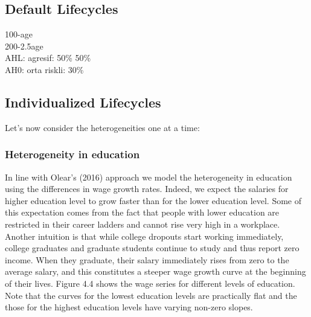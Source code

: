 \subsection{Default Lifecycles}
100-age\\
200-2.5age\\
AHL: agresif: 50\% 50\% \\
AH0: orta riskli: 30\% \\

\subsection{Individualized Lifecycles}
Let's now consider the heterogeneities one at a time:

\subsubsection{Heterogeneity in education}
In line with Olear's (2016) approach we model the heterogeneity in education using the differences in wage growth rates. Indeed, we expect the salaries for higher education level to grow faster than for the lower education level. Some of this expectation comes from the fact that people with lower education are restricted in their career ladders and cannot rise very high in a workplace. Another intuition is that while college dropouts start working immediately, college graduates and graduate students continue to study and thus report zero income. When they graduate, their salary immediately rises from zero to the average salary, and this constitutes a steeper wage growth curve at the beginning of their lives. Figure 4.4 shows the wage series for different levels of education. Note that the curves for the lowest education levels are practically flat and the those for the highest education levels have varying non-zero slopes. 

